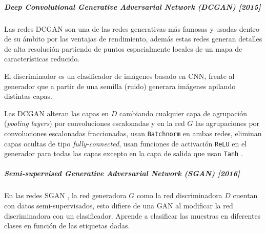 \subparagraph{Deep Convolutional Generative Adversarial Network (DCGAN) [2015]}
Las redes \gls{DCGAN} \cite{DCGAN-radford2016unsupervised,DCGAN-viola2020faultface,DCGAN-aslan2019deep,DCGAN-curto2020highresolution} son una de las redes generativas más famosas y usadas dentro de su ámbito por las ventajas de rendimiento, además estas redes generan detalles de alta resolución partiendo de puntos espacialmente locales de un mapa de características reducido.

El discriminador es un clasificador de imágenes basado en \gls{CNN}, frente al generador que a partir de una semilla (ruido) generara imágenes apilando distintas capas.

Las \gls{DCGAN} alteran las capas en ${D}$ cambiando cualquier capa de agrupación (\textit{pooling layers}) por convoluciones escalonadas y en la red ${G}$ las agrupaciones por convoluciones escalonadas fraccionadas, usan \texttt{Batchnorm} en ambas  redes, eliminan capas ocultas de tipo \textit{fully-connected}, usan funciones de activación \texttt{ReLU} en el  generador para todas las capas excepto en la capa de salida que usan \texttt{Tanh} \cite{ibm-gradient-descent}.







\subparagraph{Semi-supervised Generative Adversarial Network (SGAN) [2016]}
En las redes \gls{SGAN} \cite{SGAN-odena2016semisupervised}, la red generadora ${G}$ como la red discriminadora ${D}$ cuentan con datos semi-supervisados, esto difiere de una \gls{GAN} al modificar la red discriminadora con un clasificador. Aprende a clasificar las muestras en diferentes clases en función de las etiquetas dadas.

